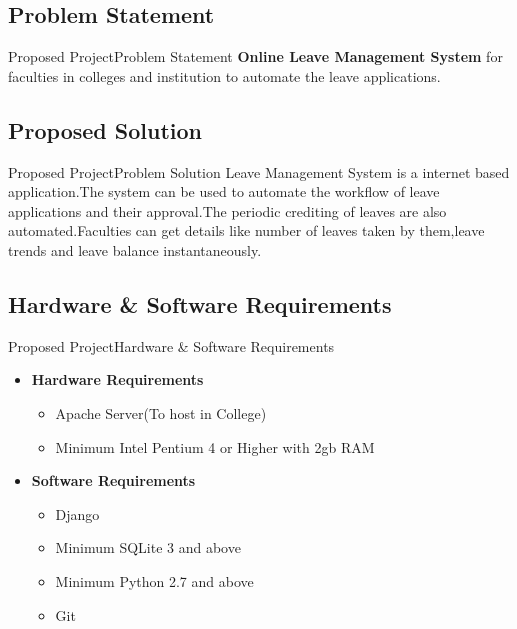 \documentclass[default]{beamer}
\begin{document}
	\subsection{Problem Statement}				
		\begin{frame}{Proposed Project}{Problem Statement}
		\textbf{Online Leave Management System} for faculties in colleges and institution to automate the leave applications.
		\end{frame}
		
	\subsection{Proposed Solution}						
		\begin{frame}{Proposed Project}{Problem Solution}
		Leave Management System is a internet based application.The system can be used to automate the workflow of leave applications and their approval.The periodic crediting of leaves are also automated.Faculties can get details like number of leaves taken by them,leave trends and leave balance instantaneously.
		\end{frame}
		
	\subsection{Hardware \& Software Requirements}						
		\begin{frame}{Proposed Project}{Hardware \& Software Requirements} 
		\begin{itemize}
		\item\textbf{Hardware Requirements}
		\begin{itemize}
		\item Apache Server(To host in College)
		\item Minimum Intel Pentium 4 or Higher with 2gb RAM
		\end{itemize}
				
		\item\textbf{Software Requirements}		
		\begin{itemize}
		\item Django
		\item Minimum SQLite 3 and above
		\item Minimum Python 2.7 and above
		\item Git
		\end{itemize}
		
		\end{itemize}
		\end{frame}
	
\end{document}
